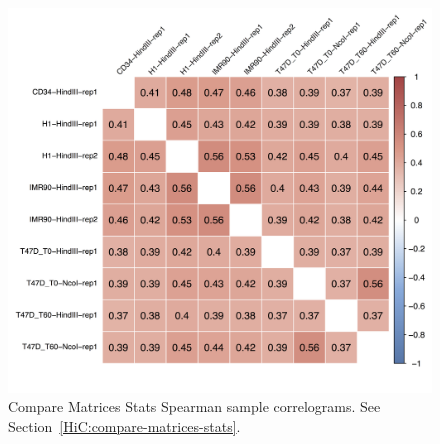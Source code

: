 \begin{figure}[!htb]
    \centering
    \includegraphics[width=\textwidth,height=\textheight,keepaspectratio]{figure/compare-matrices-stats_correlograms}
    \caption{Compare Matrices Stats Spearman sample correlograms. See Section~\ref{HiC:compare-matrices-stats}.} %
    \label{fig:compare-matrices-stats_Spearman-correlograms}
\end{figure}

